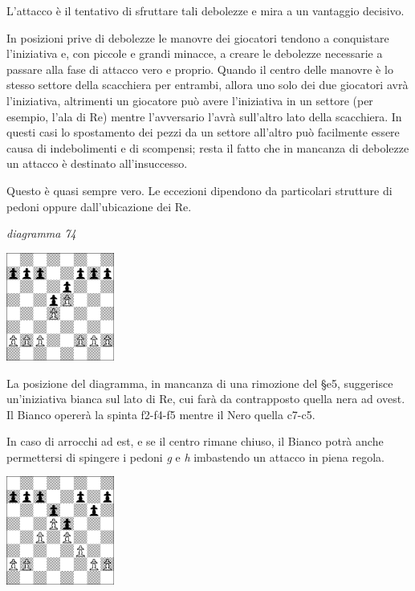 \documentclass[
]{article}
\begin{document}
L'attacco è il tentativo di sfruttare tali debolezze e mira a un
vantaggio decisivo.

In posizioni prive di debolezze le manovre dei giocatori tendono a
conquistare l'iniziativa e, con piccole e grandi minacce, a creare le
debolezze necessarie a passare alla fase di attacco vero e proprio.
Quando il centro delle manovre è lo stesso settore della scacchiera per
entrambi, allora uno solo dei due giocatori avrà l'iniziativa,
altrimenti un giocatore può avere l'iniziativa in un settore (per
esempio, l'ala di Re) mentre l'avversario l'avrà sull'altro lato della
scacchiera. In questi casi lo spostamento dei pezzi da un settore
all'altro può facilmente essere causa di indebolimenti e di scompensi;
resta il fatto che in mancanza di debolezze un attacco è destinato
all'insuccesso.

Questo è quasi sempre vero. Le eccezioni dipendono da particolari
strutture di pedoni oppure dall'ubicazione dei Re.

\emph{diagramma 74}

\includegraphics[width=1.39792in,height=1.39792in]{vertopal_109f12be458a423d8f3cc838880eaea2/media/image74.png}

La posizione del diagramma, in mancanza di una rimozione del §e5,
suggerisce un'iniziativa bianca sul lato di Re, cui farà da contrapposto
quella nera ad ovest. Il Bianco opererà la spinta f2-f4-f5 mentre il
Nero quella c7-c5.

In caso di arrocchi ad est, e se il centro rimane chiuso, il Bianco
potrà anche permettersi di spingere i pedoni \emph{g} e \emph{h}
imbastendo un attacco in piena regola.

\includegraphics[width=1.39792in,height=1.39792in]{vertopal_109f12be458a423d8f3cc838880eaea2/media/image75.png}
\end{document}
